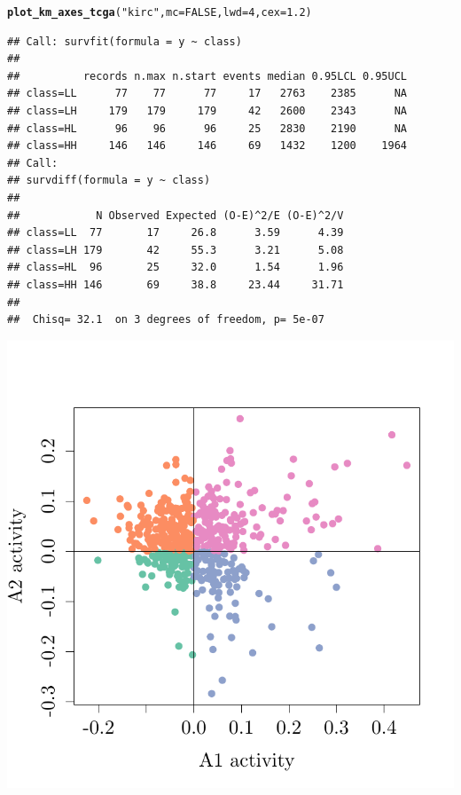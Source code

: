\documentclass{article}\usepackage[]{graphicx}\usepackage[]{color}
\makeatletter
\def\maxwidth{ %
  \ifdim\Gin@nat@width>\linewidth
    \linewidth
  \else
    \Gin@nat@width
  \fi
}
\newcommand{\hlnum}[1]{\textcolor[rgb]{0.686,0.059,0.569}{#1}}%
\newcommand{\hlstr}[1]{\textcolor[rgb]{0.192,0.494,0.8}{#1}}%
\newcommand{\hlstd}[1]{\textcolor[rgb]{0.345,0.345,0.345}{#1}}%
\newcommand{\hlkwc}[1]{\textcolor[rgb]{0.333,0.667,0.333}{#1}}%
\newcommand{\hlkwd}[1]{\textcolor[rgb]{0.737,0.353,0.396}{\textbf{#1}}}%
\newenvironment{kframe}{%
 \def\at@end@of@kframe{}%
 \ifinner\ifhmode%
  \def\at@end@of@kframe{\end{minipage}}%
  \begin{minipage}{\columnwidth}%
 \fi\fi%
 \def\FrameCommand##1{\hskip\@totalleftmargin \hskip-\fboxsep
 \colorbox{shadecolor}{##1}\hskip-\fboxsep
     \hskip-\linewidth \hskip-\@totalleftmargin \hskip\columnwidth}%
 \MakeFramed {\advance\hsize-\width
   \@totalleftmargin\z@ \linewidth\hsize
   \@setminipage}}%
 {\par\unskip\endMakeFramed%
 \at@end@of@kframe}
\newenvironment{knitrout}{}{} %
\makeatother
\begin{document}
\begin{knitrout}
{}


\begin{kframe}\begin{alltt}
\hlkwd{plot_km_axes_tcga}\hlstd{(}\hlstr{"kirc"}\hlstd{,} \hlkwc{mc} \hlstd{=} \hlnum{FALSE}\hlstd{,} \hlkwc{lwd} \hlstd{=} \hlnum{4}\hlstd{,} \hlkwc{cex} \hlstd{=} \hlnum{1.2}\hlstd{)}
\end{alltt}
\begin{verbatim}
## Call: survfit(formula = y ~ class)
## 
##          records n.max n.start events median 0.95LCL 0.95UCL
## class=LL      77    77      77     17   2763    2385      NA
## class=LH     179   179     179     42   2600    2343      NA
## class=HL      96    96      96     25   2830    2190      NA
## class=HH     146   146     146     69   1432    1200    1964
## Call:
## survdiff(formula = y ~ class)
## 
##            N Observed Expected (O-E)^2/E (O-E)^2/V
## class=LL  77       17     26.8      3.59      4.39
## class=LH 179       42     55.3      3.21      5.08
## class=HL  96       25     32.0      1.54      1.96
## class=HH 146       69     38.8     23.44     31.71
## 
##  Chisq= 32.1  on 3 degrees of freedom, p= 5e-07
\end{verbatim}
\end{kframe}

{\centering \includegraphics[width=\maxwidth]{figure/km-curves-9} 

}
\end{knitrout}
\end{document}
